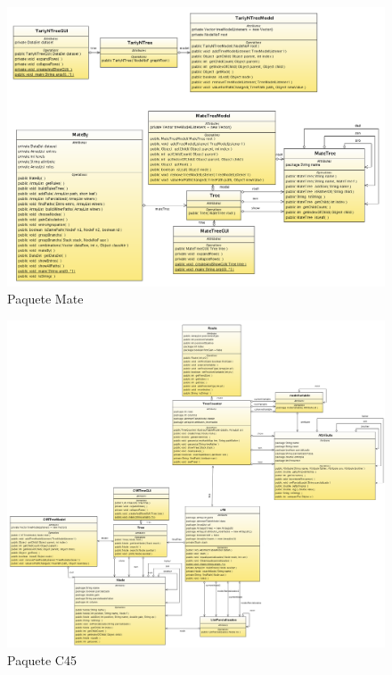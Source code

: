 \documentclass[letterpaper,12pt]{report}
\begin{document}
\newpage
\begin{figure}
\centering
\includegraphics[angle=90, width=1.4\textwidth]{Mate.png}
\caption{Paquete Mate}
\end{figure}
\newpage
\begin{figure}
\centering
\includegraphics[angle=90, width=1.8\textwidth]{c45c.png}
\caption{Paquete C45}
\end{figure}
\newpage
\end{document}
